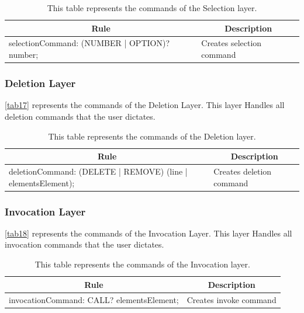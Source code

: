 \begin{table}[H]
	\centering
	\begin{tabular}{|p{8cm}|p{7cm}|}
		\hline
		\multicolumn{1}{|c|}{{\bf Rule}}             & \multicolumn{1}{c|}{{\bf Description}} \\ \hline
		selectionCommand: (NUMBER | OPTION)? number; & Creates selection command              \\ \hline
	\end{tabular}
		\caption{This table represents the commands of the Selection layer.}
		\label{tab16}
\end{table}

\subsubsection{Deletion Layer}
\autoref{tab17} represents the commands of the Deletion Layer.  This layer Handles all deletion commands that the user dictates.

\begin{table}[H]
	\centering
	\begin{tabular}{|p{8cm}|p{7cm}|}
		\hline
		\multicolumn{1}{|c|}{{\bf Rule}}                             & \multicolumn{1}{c|}{{\bf Description}} \\ \hline
		deletionCommand: (DELETE | REMOVE) (line | elementsElement); & Creates deletion command               \\ \hline
	\end{tabular}
		\caption{This table represents the commands of the Deletion layer.}
		\label{tab17}
\end{table}

\subsubsection{Invocation Layer}
\autoref{tab18} represents the commands of the Invocation Layer.  This layer Handles all invocation commands that the user dictates.

\begin{table}[H]
	\centering
	\begin{tabular}{|p{8cm}|p{7cm}|}
		\hline
		\multicolumn{1}{|c|}{{\bf Rule}}          & \multicolumn{1}{c|}{{\bf Description}} \\ \hline
		invocationCommand: CALL? elementsElement; & Creates invoke command                 \\ \hline
	\end{tabular}
		\caption{This table represents the commands of the Invocation layer.}
		\label{tab18}
\end{table}

